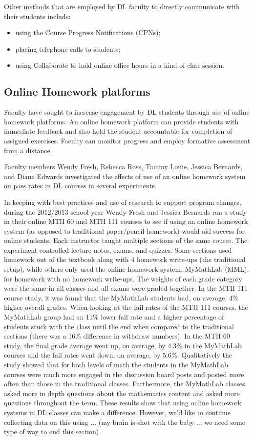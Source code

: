 Other methods that are employed by DL faculty to directly communicate with their students include:
\begin{itemize}
\item using the Course Progress Notifications (CPNs);
\item placing telephone calls to students;
\item using Collaborate to hold online office hours in a kind of chat session.
\end{itemize}

\subsection{Online Homework platforms}
Faculty have sought to increase engagement by DL students through use of online homework platforms. An online homework platform can provide students with immediate feedback and also hold the student accountable for completion of assigned exercises. Faculty can monitor progress and employ formative assessment from a distance.

Faculty members Wendy Fresh, Rebecca Ross, Tammy Louie, Jessica Bernards, and Diane Edwards investigated the effects of use of an online homework system on pass rates in DL courses in several experiments. 

In keeping with best practices and use of research to support program changes, during the 2012/2013 school year Wendy Fresh and Jessica Bernards ran a study in their online MTH 60 and MTH 111 courses to see if using an online homework system (as opposed to  traditional paper/pencil homework) would aid success for online students. Each instructor taught multiple sections of the same course. The experiment controlled lecture notes, exams, and quizzes. Some sections used homework out of the textbook along with 4 homework write-ups (the traditional setup), while others only used the online homework system, MyMathLab (MML), for homework with no homework write-ups. The weights of each grade category were the same in all classes and all exams were graded together. In the MTH 111 course study, it was found that the MyMathLab students had, on average, 4\% higher overall grades. When looking at the fail rates of the MTH 111 courses, the MyMathLab group had an 11\% lower fail rate and a higher percentage of students stuck with the class until the end when compared to the traditional sections (there was a 16\% difference in withdraw numbers). In the MTH 60 study, the final grade average went up, on average, by 4.3\% in the MyMathLab courses and the fail rates went down, on average, by 5.6\%. Qualitatively the study showed that for both levels of math the students in the MyMathLab courses were much more engaged in the discussion board posts and posted more often than those in the traditional classes. Furthermore, the MyMathLab classes asked more in depth questions about the mathematics content and asked more questions throughout the term. These results show that using online homework systems in DL classes can make a difference. However, we'd like to continue collecting data on this using ... (my brain is shot with the baby ... we need some type of way to end this section)


